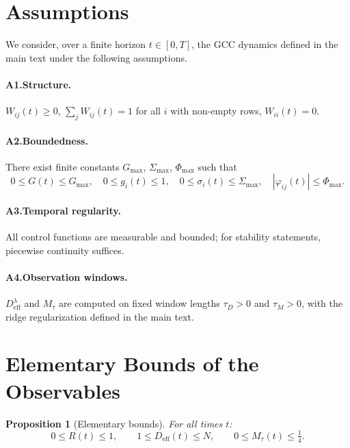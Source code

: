 \documentclass[11pt]{article}
\theoremstyle{plain}
\newtheorem{proposition}[theorem]{Proposition}
\theoremstyle{definition}
\theoremstyle{remark}
\newcommand{\Deff}{D_{\mathrm{eff}}}
\newcommand{\Mtau}{M_{\tau}}
\newcommand{\Gmax}{G_{\max}}
\begin{document}
\section{Assumptions}
\label{app:voraussetzungen}

We consider, over a finite horizon $t \in [0,T]$, the GCC dynamics defined in the main text under the following assumptions.

\paragraph{A1.\;Structure.}
$W_{ij}(t) \geq 0$, \;\;$\sum_j W_{ij}(t) = 1$ for all $i$ with non-empty rows, \;\;$W_{ii}(t) = 0$.

\paragraph{A2.\;Boundedness.}
There exist finite constants $\Gmax$, $\Sigma_{\max}$, $\Phi_{\max}$ such that
\[
0 \leq G(t) \leq \Gmax, \quad
0 \leq g_i(t) \leq 1, \quad
0 \leq \sigma_i(t) \leq \Sigma_{\max}, \quad
|\varphi_{ij}(t)| \leq \Phi_{\max}.
\]

\paragraph{A3.\;Temporal regularity.}
All control functions are measurable and bounded; for stability statements, piecewise continuity suffices.

\paragraph{A4.\;Observation windows.}
$\Deff^{\lambda}$ and $\Mtau$ are computed on fixed window lengths $\tau_D > 0$ and $\tau_M > 0$, with the ridge regularization defined in the main text.


\section{Elementary Bounds of the Observables}

\begin{proposition}[Elementary bounds]
\label{prop:schranken}
For all times $t$:
\begin{equation}
0 \leq R(t) \leq 1, \qquad
1 \leq \Deff(t) \leq N, \qquad
0 \leq \Mtau(t) \leq \tfrac{1}{4}.
\end{equation}
\end{proposition}
\end{document}
